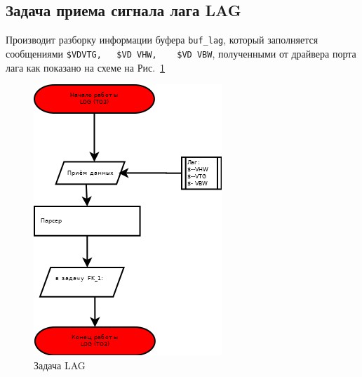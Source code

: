 \subsection{Задача приема сигнала лага LAG}
Производит  разборку информации  буфера   \verb|buf_lag|,   
который заполняется сообщениями \verb|$VDVTG,   $VD VHW,    $VD VBW|,  полученными от  драйвера  порта лага  как показано на схеме на Рис.~\ref{fig:LAG}
\begin{figure}[H]
    \centering
    \includegraphics[width=0.75\linewidth]{images/LOG.png}
    \caption{Задача LAG}
    \label{fig:LAG}
\end{figure}


